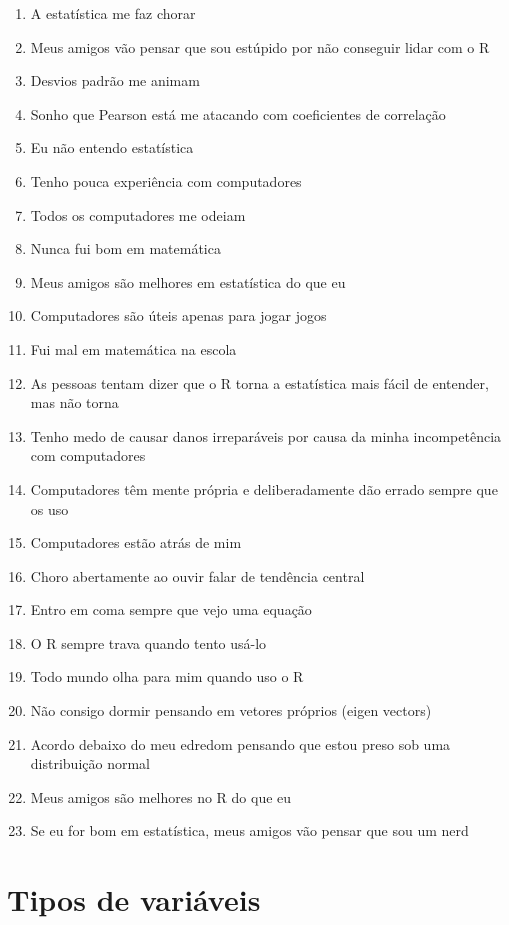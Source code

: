 \documentclass[
  letterpaper,
  DIV=11,
  numbers=noendperiod]{scrartcl}
\providecommand{\tightlist}{%
  \setlength{\itemsep}{0pt}\setlength{\parskip}{0pt}}\usepackage{longtable,booktabs,array}
\begin{document}
\begin{enumerate}
\def\labelenumi{\arabic{enumi}.}
\tightlist
\item
  A estatística me faz chorar
\item
  Meus amigos vão pensar que sou estúpido por não conseguir lidar com o
  R
\item
  Desvios padrão me animam
\item
  Sonho que Pearson está me atacando com coeficientes de correlação
\item
  Eu não entendo estatística
\item
  Tenho pouca experiência com computadores
\item
  Todos os computadores me odeiam
\item
  Nunca fui bom em matemática
\item
  Meus amigos são melhores em estatística do que eu
\item
  Computadores são úteis apenas para jogar jogos
\item
  Fui mal em matemática na escola
\item
  As pessoas tentam dizer que o R torna a estatística mais fácil de
  entender, mas não torna
\item
  Tenho medo de causar danos irreparáveis por causa da minha
  incompetência com computadores
\item
  Computadores têm mente própria e deliberadamente dão errado sempre que
  os uso
\item
  Computadores estão atrás de mim
\item
  Choro abertamente ao ouvir falar de tendência central
\item
  Entro em coma sempre que vejo uma equação
\item
  O R sempre trava quando tento usá-lo
\item
  Todo mundo olha para mim quando uso o R
\item
  Não consigo dormir pensando em vetores próprios (eigen vectors)
\item
  Acordo debaixo do meu edredom pensando que estou preso sob uma
  distribuição normal
\item
  Meus amigos são melhores no R do que eu
\item
  Se eu for bom em estatística, meus amigos vão pensar que sou um nerd
\end{enumerate}

\hypertarget{tipos-de-variuxe1veis}{%
\section{Tipos de variáveis}\label{tipos-de-variuxe1veis}}
\end{document}
